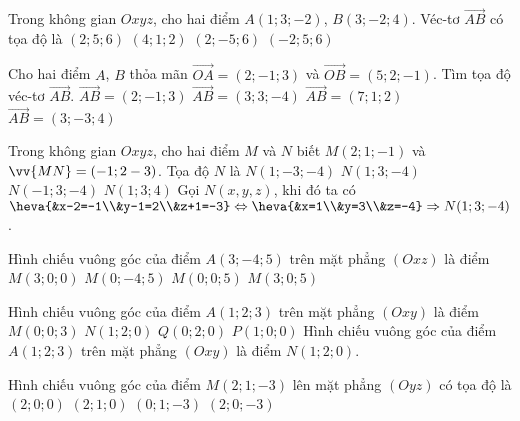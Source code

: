 \begin{ex}
	Trong không gian $ Oxyz $, cho hai điểm $ A(1;3;-2) $, $ B(3;-2;4) $. Véc-tơ $ \overrightarrow{AB} $ có tọa độ là
	\choice
	{\True $ (2;5;6) $}
	{$ (4;1;2) $}
	{\True $ (2;-5;6) $}
	{$ (-2;5;6) $}
\end{ex} 

\begin{ex}
	Cho hai điểm $A$, $B$ thỏa mãn $\vec{OA} = (2;-1; 3)$ và  $\vec{OB}= (5;2;-1)$. Tìm tọa độ véc-tơ $\vec{AB}$.
	\choice
	{$\vec{AB} =(2;-1;3)$}
	{\True  $\vec{AB} =(3;3;-4)$}
	{$\vec{AB} = (7;1;2)$}
	{$\vec{AB} =(3;-3;4)$}
\end{ex} 

\begin{ex}
	Trong không gian $Oxyz$, cho hai điểm $M$ và $N$ biết $M(2;1;-1)$ và $\vv{MN}=(-1;2-3)$. Tọa độ $N$ là
	\choice
	{$N(1;-3;-4)$}
	{\True $N(1;3;-4)$}
	{$N(-1;3;-4)$}
	{$N(1;3;4)$}
	\loigiai
	{
		Gọi $N(x,y,z)$, khi đó ta có $\heva{&x-2=-1\\&y-1=2\\&z+1=-3}\Leftrightarrow \heva{&x=1\\&y=3\\&z=-4}\Rightarrow N(1;3;-4)$.\\
	}
\end{ex} 

\begin{ex}
	Hình chiếu vuông góc của điểm $A(3;-4;5)$ trên mặt phẳng $(Oxz)$ là điểm
	\choice
	{$M(3;0;0)$}
	{$M(0;-4;5)$}
	{$M(0;0;5)$}
	{\True $M(3;0;5)$}
\end{ex} 

\begin{ex}
	Hình chiếu vuông góc của điểm $A(1;2;3)$ trên mặt phẳng $(Oxy)$ là điểm
	\choice
	{$M(0;0;3)$}
	{\True $N(1;2;0)$}
	{$Q(0;2;0)$}
	{$P(1;0;0)$}
	\loigiai
	{
		Hình chiếu vuông góc của điểm $A(1;2;3)$ trên mặt phẳng $(Oxy)$ là điểm $N(1;2;0)$.
	}
\end{ex} 

\begin{ex}
	Hình chiếu vuông góc của điểm $M(2;1;-3)$ lên mặt phẳng $(Oyz)$ có tọa độ là
	\choice
	{$(2;0;0)$}
	{$(2;1;0)$}
	{\True $(0;1;-3)$}
	{$(2;0;-3)$}
\end{ex} 

